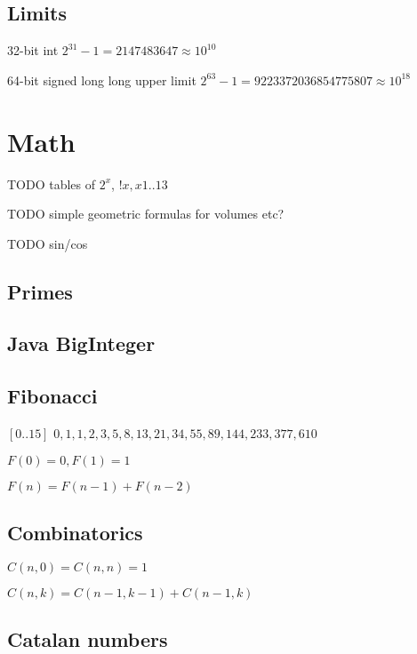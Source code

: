 \documentclass[a4paper,landscape,8pt]{article}
\begin{document}
\begin{multicols}{2}
\subsection{Limits}

32-bit int $2^{31} - 1 = 2147483647 \approx 10^{10}$

64-bit signed long long upper limit $2^{63} - 1 = 9223372036854775807 \approx 10^{18}$


\section{Math}

TODO tables of $2^x$, $!x, x 1..13$

TODO simple geometric formulas for volumes etc?

TODO sin/cos



\subsection{Primes}



\subsection{Java BigInteger}





\subsection{Fibonacci}

$[0..15]$ $0, 1, 1, 2, 3, 5, 8, 13, 21, 34, 55, 89, 144, 233, 377, 610$

$F(0) = 0, F(1) = 1$

$F(n) = F(n - 1) + F(n - 2)$

\subsection{Combinatorics}

$C(n,0) = C(n,n) = 1$

$C(n,k) = C(n - 1, k - 1) + C(n - 1, k)$

\subsection{Catalan numbers}


\end{multicols}
\end{document}

